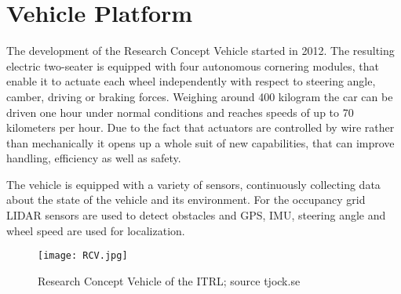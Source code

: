 \chapter{Vehicle Platform}
The development of the Research Concept Vehicle started in 2012. The resulting electric two-seater is equipped with four autonomous cornering modules, that enable it to actuate each wheel independently with respect to steering angle, camber, driving or braking forces. Weighing around 400 kilogram the car can be driven one hour under normal conditions and reaches speeds of up to 70 kilometers per hour. Due to the fact that actuators are controlled by wire rather than mechanically it opens up a whole suit of new capabilities, that can improve handling, efficiency as well as safety.

The vehicle is equipped with a variety of sensors, continuously collecting data about the state of the vehicle and its environment. For the occupancy grid LIDAR sensors are used to detect obstacles and GPS, IMU, steering angle and wheel speed are used for localization.


\begin{figure}[h]
\texttt{[image: RCV.jpg]}
\caption[Research Concept Vehicle of the ITRL]{Research Concept Vehicle of the ITRL; source tjock.se}
\label{fig:RCV}
\end{figure}